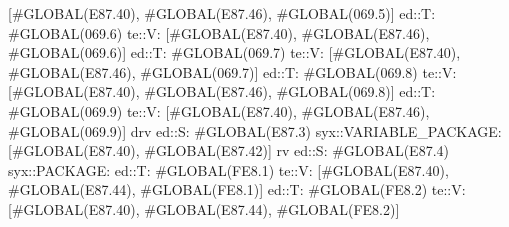                                                                                  [#GLOBAL(E87.40), #GLOBAL(E87.46), #GLOBAL(069.5)]
                                                                                ed::T: #GLOBAL(069.6)
                                                                                 te::V:
                                                                                 [#GLOBAL(E87.40), #GLOBAL(E87.46), #GLOBAL(069.6)]
                                                                                ed::T: #GLOBAL(069.7)
                                                                                 te::V:
                                                                                 [#GLOBAL(E87.40), #GLOBAL(E87.46), #GLOBAL(069.7)]
                                                                                ed::T: #GLOBAL(069.8)
                                                                                 te::V:
                                                                                 [#GLOBAL(E87.40), #GLOBAL(E87.46), #GLOBAL(069.8)]
                                                                                ed::T: #GLOBAL(069.9)
                                                                                 te::V:
                                                                                 [#GLOBAL(E87.40), #GLOBAL(E87.46), #GLOBAL(069.9)]
                                                                             drv
                                                                            ed::S: #GLOBAL(E87.3)
                                                                             syx::VARIABLE_PACKAGE:
                                                                             [#GLOBAL(E87.40), #GLOBAL(E87.42)]
                                                                             rv
                                                                            ed::S: #GLOBAL(E87.4)
                                                                             syx::PACKAGE:
                                                                                ed::T: #GLOBAL(FE8.1)
                                                                                 te::V:
                                                                                 [#GLOBAL(E87.40), #GLOBAL(E87.44), #GLOBAL(FE8.1)]
                                                                                ed::T: #GLOBAL(FE8.2)
                                                                                 te::V:
                                                                                 [#GLOBAL(E87.40), #GLOBAL(E87.44), #GLOBAL(FE8.2)]
